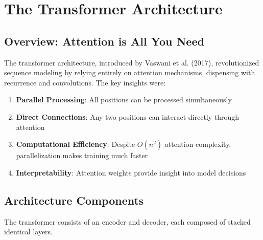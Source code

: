 \documentclass[11pt]{article}
\begin{document}
\section{The Transformer Architecture}

\subsection{Overview: Attention is All You Need}

The transformer architecture, introduced by Vaswani et al. (2017), revolutionized sequence modeling by relying entirely on attention mechanisms, dispensing with recurrence and convolutions. The key insights were:

\begin{enumerate}
    \item \textbf{Parallel Processing}: All positions can be processed simultaneously
    \item \textbf{Direct Connections}: Any two positions can interact directly through attention
    \item \textbf{Computational Efficiency}: Despite $O(n^2)$ attention complexity, parallelization makes training much faster
    \item \textbf{Interpretability}: Attention weights provide insight into model decisions
\end{enumerate}

\subsection{Architecture Components}

The transformer consists of an encoder and decoder, each composed of stacked identical layers.
\end{document}
